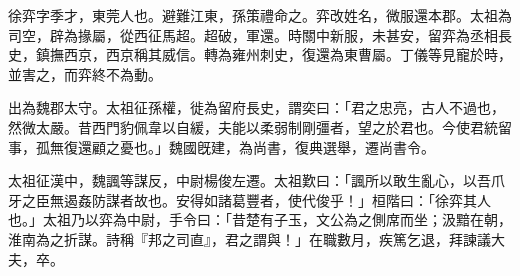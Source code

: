 \begin{pinyinscope}
 
 
 徐弈字季才，東莞人也。避難江東，孫策禮命之。弈改姓名，微服還本郡。太祖為司空，辟為掾屬，從西征馬超。超破，軍還。時關中新服，未甚安，留弈為丞相長史，鎮撫西京，西京稱其威信。轉為雍州刺史，復還為東曹屬。丁儀等見寵於時，並害之，而弈終不為動。
 
 
 出為魏郡太守。太祖征孫權，徙為留府長史，謂奕曰：「君之忠亮，古人不過也，然微太嚴。昔西門豹佩韋以自緩，夫能以柔弱制剛彊者，望之於君也。今使君統留事，孤無復還顧之憂也。」魏國旣建，為尚書，復典選舉，遷尚書令。
 
 
太祖征漢中，魏諷等謀反，中尉楊俊左遷。太祖歎曰：「諷所以敢生亂心，以吾爪牙之臣無遏姦防謀者故也。安得如諸葛豐者，使代俊乎！」桓階曰：「徐弈其人也。」太祖乃以弈為中尉，手令曰：「昔楚有子玉，文公為之側席而坐；汲黯在朝，淮南為之折謀。詩稱『邦之司直』，君之謂與！」在職數月，疾篤乞退，拜諫議大夫，卒。
 
 
\end{pinyinscope}